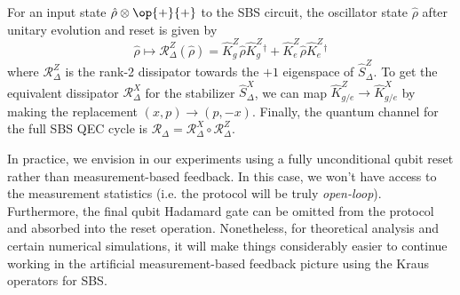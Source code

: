 For an input state $\hat{\rho}\otimes \op{+}{+}$ to the SBS circuit, the oscillator state $\hat{\rho}$ after unitary evolution and reset is given by
\begin{equation}
    \hat{\rho} \mapsto \mathcal{R}_\Delta^Z(\hat{\rho}) = \hat{K}_g^Z \hat{\rho} \hat{K}_g^Z{}^\dagger + \hat{K}_e^Z \hat{\rho} \hat{K}_e^Z{}^\dagger  
\end{equation}
where $\mathcal{R}_\Delta^Z$ is the rank-2 dissipator towards the $+1$ eigenspace of $\hat{S}_\Delta^Z$. To get the equivalent dissipator $\mathcal{R}_\Delta^X$ for the stabilizer $\hat{S}_\Delta^X$, we can map $\hat{K}_{g/e}^Z \to \hat{K}_{g/e}^X$ by making the replacement $(x, p) \to (p, -x)$. Finally, the quantum channel for the full SBS QEC cycle is $\mathcal{R}_\Delta = \mathcal{R}_\Delta^X \circ \mathcal{R}_\Delta^Z$. 

In practice, we envision in our experiments using a fully unconditional qubit reset rather than measurement-based feedback. In this case, we won't have access to the measurement statistics (i.e. the protocol will be truly \textit{open-loop}). Furthermore, the final qubit Hadamard gate can be omitted from the protocol and absorbed into the reset operation. Nonetheless, for theoretical analysis and certain numerical simulations, it will make things considerably easier to continue working in the artificial measurement-based feedback picture using the Kraus operators for SBS.

